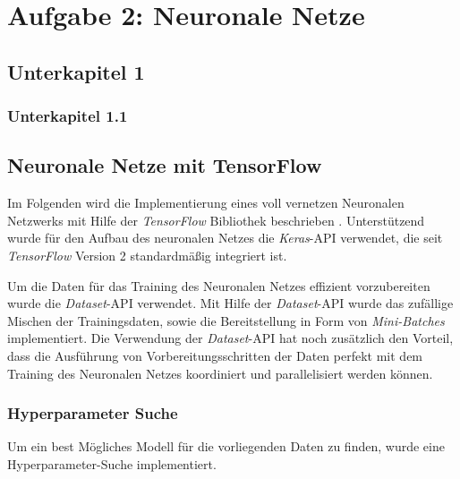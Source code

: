 \pagebreak
\section{Aufgabe 2: Neuronale Netze}
\subsection{Unterkapitel 1}
\subsubsection{Unterkapitel 1.1}
\subsection{Neuronale Netze mit TensorFlow}
Im Folgenden wird die Implementierung eines voll vernetzen Neuronalen Netzwerks mit Hilfe der \emph{TensorFlow} Bibliothek beschrieben \cite{tensorflow2015-whitepaper}. Unterstützend wurde für den Aufbau des neuronalen Netzes die \emph{Keras}-API verwendet, die seit \emph{TensorFlow} Version 2 standardmäßig integriert ist. 

Um die Daten für das Training des Neuronalen Netzes effizient vorzubereiten wurde die \emph{Dataset}-API verwendet. Mit Hilfe der \emph{Dataset}-API wurde das zufällige Mischen der Trainingsdaten, sowie die Bereitstellung in Form von \emph{Mini-Batches} implementiert. Die Verwendung der \emph{Dataset}-API hat noch zusätzlich den Vorteil, dass die Ausführung von Vorbereitungsschritten der Daten perfekt mit dem Training des Neuronalen Netzes koordiniert und parallelisiert werden können.

\subsubsection{Hyperparameter Suche}
Um ein best Mögliches Modell für die vorliegenden Daten zu finden, wurde eine Hyperparameter-Suche implementiert.
